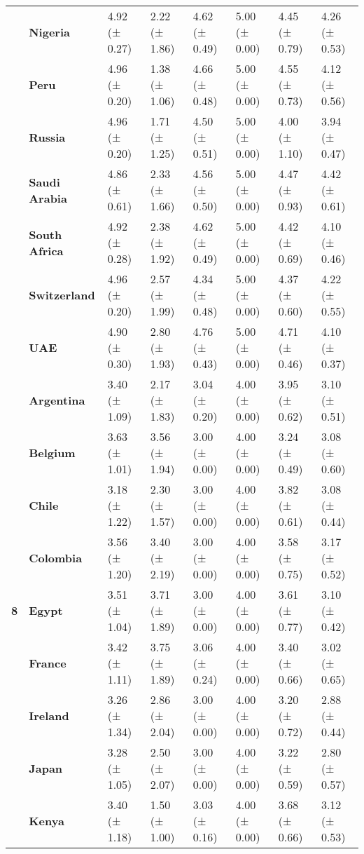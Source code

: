 \begin{tabular}{llllllll}
\textbf{} & \textbf{Nigeria} & 4.92 (± 0.27) & 2.22 (± 1.86) & 4.62 (± 0.49) & 5.00 (± 0.00) & 4.45 (± 0.79) & 4.26 (± 0.53) \\
\textbf{} & \textbf{Peru} & 4.96 (± 0.20) & 1.38 (± 1.06) & 4.66 (± 0.48) & 5.00 (± 0.00) & 4.55 (± 0.73) & 4.12 (± 0.56) \\
\textbf{} & \textbf{Russia} & 4.96 (± 0.20) & 1.71 (± 1.25) & 4.50 (± 0.51) & 5.00 (± 0.00) & 4.00 (± 1.10) & 3.94 (± 0.47) \\
\textbf{} & \textbf{Saudi Arabia} & 4.86 (± 0.61) & 2.33 (± 1.66) & 4.56 (± 0.50) & 5.00 (± 0.00) & 4.47 (± 0.93) & 4.42 (± 0.61) \\
\textbf{} & \textbf{South Africa} & 4.92 (± 0.28) & 2.38 (± 1.92) & 4.62 (± 0.49) & 5.00 (± 0.00) & 4.42 (± 0.69) & 4.10 (± 0.46) \\
\textbf{} & \textbf{Switzerland} & 4.96 (± 0.20) & 2.57 (± 1.99) & 4.34 (± 0.48) & 5.00 (± 0.00) & 4.37 (± 0.60) & 4.22 (± 0.55) \\
\textbf{} & \textbf{UAE} & 4.90 (± 0.30) & 2.80 (± 1.93) & 4.76 (± 0.43) & 5.00 (± 0.00) & 4.71 (± 0.46) & 4.10 (± 0.37) \\
\cline{1-8}
\multirow[t]{19}{*}{\textbf{8}} & \textbf{Argentina} & 3.40 (± 1.09) & 2.17 (± 1.83) & 3.04 (± 0.20) & 4.00 (± 0.00) & 3.95 (± 0.62) & 3.10 (± 0.51) \\
\textbf{} & \textbf{Belgium} & 3.63 (± 1.01) & 3.56 (± 1.94) & 3.00 (± 0.00) & 4.00 (± 0.00) & 3.24 (± 0.49) & 3.08 (± 0.60) \\
\textbf{} & \textbf{Chile} & 3.18 (± 1.22) & 2.30 (± 1.57) & 3.00 (± 0.00) & 4.00 (± 0.00) & 3.82 (± 0.61) & 3.08 (± 0.44) \\
\textbf{} & \textbf{Colombia} & 3.56 (± 1.20) & 3.40 (± 2.19) & 3.00 (± 0.00) & 4.00 (± 0.00) & 3.58 (± 0.75) & 3.17 (± 0.52) \\
\textbf{} & \textbf{Egypt} & 3.51 (± 1.04) & 3.71 (± 1.89) & 3.00 (± 0.00) & 4.00 (± 0.00) & 3.61 (± 0.77) & 3.10 (± 0.42) \\
\textbf{} & \textbf{France} & 3.42 (± 1.11) & 3.75 (± 1.89) & 3.06 (± 0.24) & 4.00 (± 0.00) & 3.40 (± 0.66) & 3.02 (± 0.65) \\
\textbf{} & \textbf{Ireland} & 3.26 (± 1.34) & 2.86 (± 2.04) & 3.00 (± 0.00) & 4.00 (± 0.00) & 3.20 (± 0.72) & 2.88 (± 0.44) \\
\textbf{} & \textbf{Japan} & 3.28 (± 1.05) & 2.50 (± 2.07) & 3.00 (± 0.00) & 4.00 (± 0.00) & 3.22 (± 0.59) & 2.80 (± 0.57) \\
\textbf{} & \textbf{Kenya} & 3.40 (± 1.18) & 1.50 (± 1.00) & 3.03 (± 0.16) & 4.00 (± 0.00) & 3.68 (± 0.66) & 3.12 (± 0.53) \\

\end{tabular}
